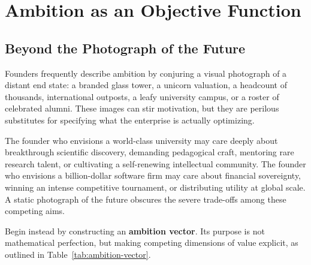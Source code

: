 \section{Ambition as an Objective Function}

\subsection{Beyond the Photograph of the Future}

Founders frequently describe ambition by conjuring a visual photograph of a distant end state: a branded glass tower, a unicorn valuation, a headcount of thousands, international outposts, a leafy university campus, or a roster of celebrated alumni. These images can stir motivation, but they are perilous substitutes for specifying what the enterprise is actually optimizing.

The founder who envisions a world-class university may care deeply about breakthrough scientific discovery, demanding pedagogical craft, mentoring rare research talent, or cultivating a self-renewing intellectual community. The founder who envisions a billion-dollar software firm may care about financial sovereignty, winning an intense competitive tournament, or distributing utility at global scale. A static photograph of the future obscures the severe trade-offs among these competing aims.

Begin instead by constructing an \textbf{ambition vector}. Its purpose is not mathematical perfection, but making competing dimensions of value explicit, as outlined in Table~\ref{tab:ambition-vector}.

